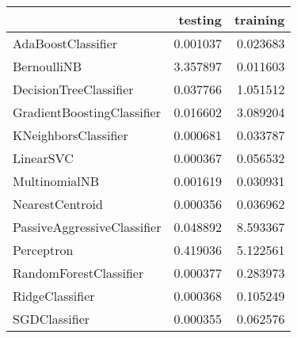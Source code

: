 \begin{tabular}{lrr}
\toprule
{} &   testing &  training \\
\midrule
AdaBoostClassifier          &  0.001037 &  0.023683 \\
BernoulliNB                 &  3.357897 &  0.011603 \\
DecisionTreeClassifier      &  0.037766 &  1.051512 \\
GradientBoostingClassifier  &  0.016602 &  3.089204 \\
KNeighborsClassifier        &  0.000681 &  0.033787 \\
LinearSVC                   &  0.000367 &  0.056532 \\
MultinomialNB               &  0.001619 &  0.030931 \\
NearestCentroid             &  0.000356 &  0.036962 \\
PassiveAggressiveClassifier &  0.048892 &  8.593367 \\
Perceptron                  &  0.419036 &  5.122561 \\
RandomForestClassifier      &  0.000377 &  0.283973 \\
RidgeClassifier             &  0.000368 &  0.105249 \\
SGDClassifier               &  0.000355 &  0.062576 \\
\bottomrule
\end{tabular}
